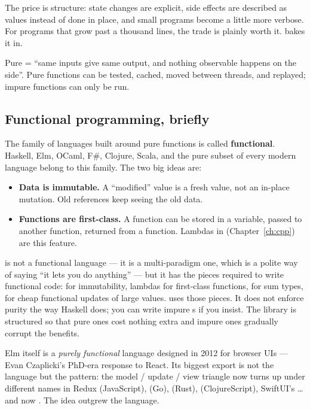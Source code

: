 The price is structure: state changes are explicit, side effects are
described as values instead of done in place, and small programs
become a little more verbose. For programs that grow past a thousand
lines, the trade is plainly worth it. \maya{} bakes it in.

\begin{idea}
Pure = ``same inputs give same output, and nothing observable
happens on the side''. Pure functions can be tested, cached, moved
between threads, and replayed; impure functions can only be run.
\end{idea}

\subsection{Functional programming, briefly}

The family of languages built around pure functions is called
\textbf{functional}. Haskell, Elm, OCaml, F\#, Clojure, Scala, and
the pure subset of every modern language belong to this family. The
two big ideas are:

\begin{itemize}[leftmargin=*]
  \item \textbf{Data is immutable.} A ``modified'' value is a fresh
    value, not an in-place mutation. Old references keep seeing the
    old data.
  \item \textbf{Functions are first-class.} A function can be
    stored in a variable, passed to another function, returned from
    a function. Lambdas in \cpp{} (Chapter~\ref{ch:cpp}) are this
    feature.
\end{itemize}

\cpp{} is not a functional language --- it is a multi-paradigm one,
which is a polite way of saying ``it lets you do anything'' --- but
it has the pieces required to write functional code: 
for immutability, lambdas for first-class functions, 
for sum types,  for cheap functional updates of
large values. \maya{} uses those pieces. It does not enforce purity
the way Haskell does; you can write impure s if you
insist. The library is structured so that pure ones cost nothing
extra and impure ones gradually corrupt the benefits.

\begin{funfact}
Elm itself is a \emph{purely functional} language designed in 2012
for browser UIs --- Evan Czaplicki's PhD-era response to React. Its
biggest export is not the language but the pattern: the model /
update / view triangle now turns up under different names in Redux
(JavaScript),  (Go),  (Rust),
 (ClojureScript), SwiftUI's \dots and now
\maya{}. The idea outgrew the language.
\end{funfact}

